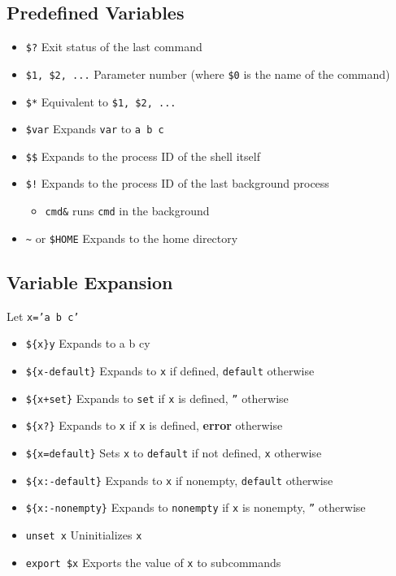 \documentclass[13pt]{article}
\begin{document}
\subsection{Predefined Variables}
\begin{itemize}[leftmargin = 0pt]
\item [] \texttt{\$?} Exit status of the last command
\item [] \texttt{\$1, \$2, ...} Parameter number (where \texttt{\$0} is the name of the command)
\item [] \texttt{\$*} Equivalent to \texttt{\$1, \$2, ...}
\item [] \texttt{\$var} Expands \texttt{var} to \texttt{a b c}
\item [] \texttt{\$\$} Expands to the process ID of the shell itself
\item [] \texttt{\$!} Expands to the process ID of the last background process
  \begin{itemize}[leftmargin = 0pt]
  \item [] \texttt{cmd\&} runs \texttt{cmd} in the background
  \end{itemize}
\item [] \texttt{\textasciitilde} or \texttt{\$HOME} Expands to the home directory
\end{itemize}

\subsection{Variable Expansion}
Let \texttt{x='a b c'}
\begin{itemize}[leftmargin = 0pt]
\item [] \texttt{\$\{x\}y} Expands to a b cy
\item [] \texttt{\$\{x-default\}} Expands to \texttt{x} if defined, \texttt{default} otherwise
\item [] \texttt{\$\{x+set\}} Expands to \texttt{set} if \texttt{x} is defined, \texttt{''} otherwise
\item [] \texttt{\$\{x?\}} Expands to \texttt{x} if \texttt{x} is defined, \textbf{error} otherwise
\item [] \texttt{\$\{x=default\}} Sets \texttt{x} to \texttt{default} if not defined, \texttt{x} otherwise
\item [] \texttt{\$\{x:-default\}} Expands to \texttt{x} if nonempty, \texttt{default} otherwise
\item [] \texttt{\$\{x:-nonempty\}} Expands to \texttt{nonempty} if \texttt{x} is nonempty, \texttt{''} otherwise
\item [] \texttt{unset x} Uninitializes \texttt{x}
\item [] \texttt{export \$x} Exports the value of \texttt{x} to subcommands
\end{itemize}
\end{document}
